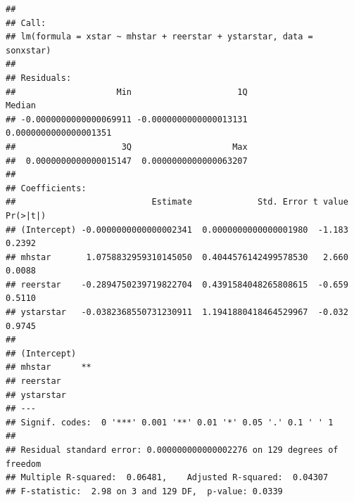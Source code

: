 \documentclass[]{article}
\newenvironment{Shaded}{\begin{snugshade}}{\end{snugshade}}
\newcommand{\KeywordTok}[1]{\textcolor[rgb]{0.13,0.29,0.53}{\textbf{#1}}}
\newcommand{\DataTypeTok}[1]{\textcolor[rgb]{0.13,0.29,0.53}{#1}}
\newcommand{\DecValTok}[1]{\textcolor[rgb]{0.00,0.00,0.81}{#1}}
\newcommand{\StringTok}[1]{\textcolor[rgb]{0.31,0.60,0.02}{#1}}
\newcommand{\OperatorTok}[1]{\textcolor[rgb]{0.81,0.36,0.00}{\textbf{#1}}}
\newcommand{\NormalTok}[1]{#1}
\begin{document}
\begin{Shaded}
\end{Shaded}

\begin{verbatim}
## 
## Call:
## lm(formula = xstar ~ mhstar + reerstar + ystarstar, data = sonxstar)
## 
## Residuals:
##                    Min                     1Q                 Median 
## -0.0000000000000069911 -0.0000000000000013131  0.0000000000000001351 
##                     3Q                    Max 
##  0.0000000000000015147  0.0000000000000063207 
## 
## Coefficients:
##                           Estimate             Std. Error t value Pr(>|t|)
## (Intercept) -0.0000000000000002341  0.0000000000000001980  -1.183   0.2392
## mhstar       1.0758832959310145050  0.4044576142499578530   2.660   0.0088
## reerstar    -0.2894750239719822704  0.4391584048265808615  -0.659   0.5110
## ystarstar   -0.0382368550731230911  1.1941880418464529967  -0.032   0.9745
##               
## (Intercept)   
## mhstar      **
## reerstar      
## ystarstar     
## ---
## Signif. codes:  0 '***' 0.001 '**' 0.01 '*' 0.05 '.' 0.1 ' ' 1
## 
## Residual standard error: 0.000000000000002276 on 129 degrees of freedom
## Multiple R-squared:  0.06481,    Adjusted R-squared:  0.04307 
## F-statistic:  2.98 on 3 and 129 DF,  p-value: 0.0339
\end{verbatim}
\end{document}
